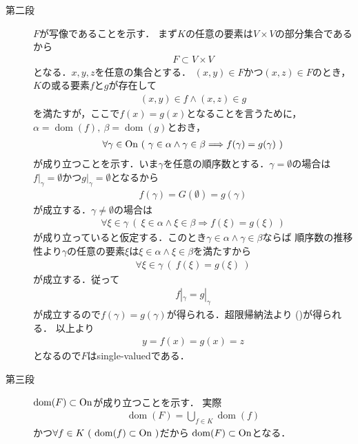 \begin{prf}
\begin{description}
			\item[第二段] $F$が写像であることを示す．
				まず$K$の任意の要素は$V \times V$の部分集合であるから
				\begin{align}
					F \subset V \times V
				\end{align}
				となる．$x,y,z$を任意の集合とする．
				$(x,y) \in F$かつ$(x,z) \in F$のとき，
				$K$の或る要素$f$と$g$が存在して
				\begin{align}
					(x,y) \in f \wedge (x,z) \in g
				\end{align}
				を満たすが，ここで$f(x) = g(x)$となることを言うために，
				$\alpha = \operatorname{dom}(f),\ 
				\beta = \operatorname{dom}(g)$とおき，
				\begin{align}
					\forall \gamma \in \mathrm{On}\ (\ \gamma \in \alpha \wedge \gamma \in \beta \Longrightarrow f(\gamma) = g(\gamma)\ )
					\label{eq:thm_transfinite_recursion_theorem_1}
				\end{align}
				が成り立つことを示す．いま$\gamma$を任意の順序数とする．$\gamma = \emptyset$の場合は
				$f|_\gamma = \emptyset$かつ$g|_\gamma = \emptyset$となるから
				\begin{align}
					f(\gamma) = G(\emptyset) = g(\gamma)
				\end{align}
				が成立する．$\gamma \neq \emptyset$の場合は
				\begin{align}
					\forall \xi \in \gamma\ (\ \xi \in \alpha \wedge \xi \in \beta \Longrightarrow f(\xi) = g(\xi)\ )
				\end{align}
				が成り立っていると仮定する．このとき$\gamma \in \alpha \wedge \gamma \in \beta$ならば
				順序数の推移性より$\gamma$の任意の要素$\xi$は$\xi \in \alpha \wedge \xi \in \beta$を満たすから
				\begin{align}
					\forall \xi \in \gamma\ (\ f(\xi) = g(\xi)\ )
				\end{align}
				が成立する．従って
				\begin{align}
					f|_\gamma = g|_\gamma
				\end{align}
				が成立するので$f(\gamma) = g(\gamma)$が得られる．超限帰納法より
				()が得られる．
				以上より
				\begin{align}
					y = f(x) = g(x) = z
				\end{align}
				となるので$F$はsingle-valuedである．
			
			\item[第三段] $\operatorname{dom}(F) \subset \mathrm{On}$が成り立つことを示す．
				実際
				\begin{align}
					\operatorname{dom}(F) = \bigcup_{f \in K} \operatorname{dom}(f)
				\end{align}
				かつ$\forall f \in K\ (\ \operatorname{dom}(f) \subset \mathrm{On}\ )$だから
				$\operatorname{dom}(F) \subset \mathrm{On}$となる．
				

\end{description}
\end{prf}
